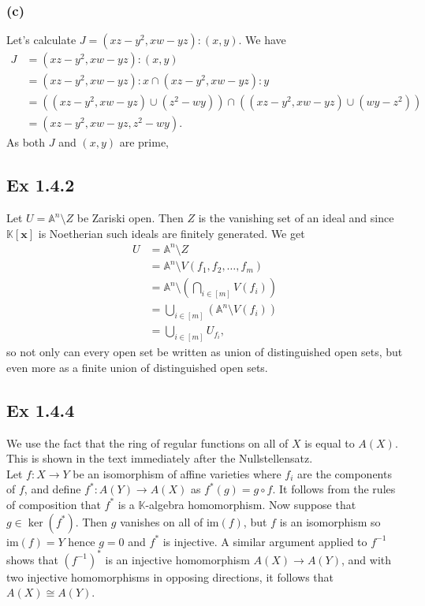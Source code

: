 \documentclass{article}
\theoremstyle{definition}
\newcommand{\K}{\mathbb{K}}
\newcommand{\A}{\mathbb{A}}
\newcommand{\Kx}{\K[\bm{x}]}
\newcommand{\An}{\A^n}
\newcommand{\im}{\text{im}}
\begin{document}
\subsubsection*{(c)}

Let's calculate $J = (xz - y^2, xw - yz) : (x, y)$.
We have
\begin{align*}
	J
	&=
	(xz - y^2, xw - yz) : (x, y) \\
	&= 
	(xz - y^2, xw - yz) : x 
	\cap
	(xz - y^2, xw - yz) : y \\
	&=
	\left(
		(xz - y^2, xw - yz) 
		\cup
		(z^2 - wy)
	\right)
	\cap
	\left(
		(xz - y^2, xw - yz) 
		\cup
		(wy - z^2)
	\right) \\
	&=
	(xz - y^2, xw - yz, z^2 - wy).
\end{align*}
As both $J$ and $(x, y)$ are prime, 

\subsection*{Ex 1.4.2}

Let $U = \An \setminus Z$ be Zariski open. Then $Z$ is the vanishing set of an
ideal and since $\Kx$ is Noetherian such ideals are finitely generated. We get
\begin{align*}
	U 
	&= 
	\An \setminus Z \\
	&=
	\An
	\setminus
	V(f_1, f_2, \ldots, f_m) \\
	&=
	\An
	\setminus
	\left(
		\bigcap_{i \in [m]} V(f_i)
	\right)\\
	&=
	\bigcup_{i \in [m]}
	\left(
		\An
		\setminus
		V(f_i)
	\right) \\
	&=
	\bigcup_{i \in [m]}
	U_{f_i},
\end{align*}
so not only can every open set be written as union of distinguished open sets,
but even more as a finite union of distinguished open sets.

\subsection*{Ex 1.4.4}

We use the fact that the ring of regular functions on all of $X$ is equal to
$A(X)$. This is shown in the text immediately after the Nullstellensatz. \\

Let $f : X \to Y$ be an isomorphism of affine varieties where $f_i$ are the
components of $f$, and define $f^* : A(Y) \to A(X)$ as $f^*(g) = g \circ f$. It
follows from the rules of composition that $f^*$ is a $\K$-algebra
homomorphism. Now suppose that $g \in \ker(f^*)$. Then $g$ vanishes on all of
$\im(f)$, but $f$ is an isomorphism so $\im(f) = Y$ hence $g = 0$ and $f^*$ is
injective. A similar argument applied to $f^{-1}$ shows that $(f^{-1})^*$ is an
injective homomorphism $A(X) \to A(Y)$, and with two injective homomorphisms in
opposing directions, it follows that $A(X) \cong A(Y)$. \\
\end{document}

